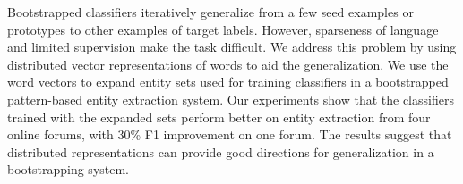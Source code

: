 Bootstrapped classifiers iteratively generalize from a few seed examples or prototypes to other examples of target labels. However, sparseness of language and  limited supervision make the task difficult. We address this problem by using distributed vector representations of words to aid the generalization. We use the word vectors to expand entity sets used for training classifiers in a bootstrapped pattern-based entity extraction system. Our experiments show that the classifiers trained with the expanded sets perform better on entity extraction from four online forums, with 30\% F1 improvement on one forum. The results suggest that distributed representations can provide good directions for generalization in a bootstrapping system.

